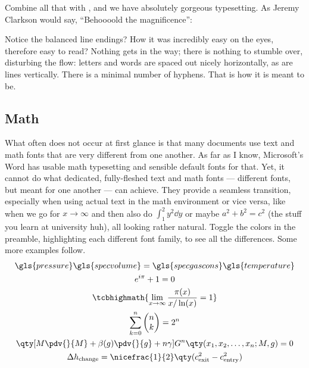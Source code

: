 Combine all that with , and we have absolutely gorgeous typesetting.
As Jeremy Clarkson would say, \enquote{Behoooold the magnificence}:

\vspace{1\baselineskip}
\parbox{0.9\linewidth}{%
\textcolor{g1}{\kant[1]}
}
\vspace{1\baselineskip}

\noindent Notice the balanced line endings?
How it was incredibly easy on the eyes, therefore easy to read?
Nothing gets in the way; there is nothing to stumble over, disturbing the flow: letters and words are spaced out nicely horizontally, as are lines vertically.
There is a minimal number of hyphens.
That is how it is meant to be.

\subsection{Math}
What often does not occur at first glance is that many documents use text and math fonts that are very different from one another.
As far as I know, Microsoft's Word has usable math typesetting and sensible default fonts for that.
Yet, it cannot do what dedicated, fully-fleshed text and math fonts --- different fonts, but meant for one another --- can achieve.
They provide a seamless transition, especially when using actual text in the math environment or vice versa, like when we go for \(x \to \infty\) and then also do \(\int_{1}^{2} y^2 \dd{y}\) or maybe \(a^2 + b^2 = c^2\) (the stuff you learn at university huh), all looking rather natural.
Toggle the colors in the preamble, highlighting each different font family, to see all the differences.
Some more examples follow.
\begin{gather}
	\gls{pressure}\gls{specvolume} = \gls{specgascons}\gls{temperature}\label{eq:click_me}\\
	e^{i\pi} + 1 = 0\\
	\tcbhighmath{\lim\limits_{x \to \infty} \frac{\pi(x)}{x / \ln(x)} = 1}\label{eq:highlighted}\\
	\sum_{k = 0}^{n} %
	\begin{pmatrix}%
		n \\ k
	\end{pmatrix}%
	= 2^{n}\\
	\qty[M \pdv{}{M} + \beta(g) \pdv{}{g} + n\gamma] G^{n} \qty(x_{1}, x_{2}, \dots, x_{n}; M, g) = 0\\
	\Delta h_{\text{change}} = \nicefrac{1}{2}\qty(c^2_{\text{exit}} - c^2_{\text{entry}})
\end{gather}

